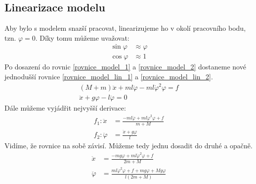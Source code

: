 \documentclass[a4paper, 12pt]{article}
\begin{document}
		\subsection{Linearizace modelu}
			Aby bylo s modelem snazší pracovat, linearizujeme ho v okolí pracovního bodu, tzn. $\varphi = 0$. Díky tomu můžeme uvažovat:
			\begin{align*}
				\sin\varphi &\approx \varphi\\
				\cos\varphi	&\approx 1
			\end{align*}
			Po dosazení do rovnic \ref{rovnice_model_1} a \ref{rovnice_model_2} dostaneme nové jednodušší rovnice \ref{rovnice_model_lin_1} a \ref{rovnice_model_lin_2}.
			\begin{align}
				\left(M+m\right)\ddot{x}+ml\ddot{\varphi}-ml\dot{\varphi}^2\varphi = f
				\label{rovnice_model_lin_1}\\
				\ddot{x}+g\varphi-l\ddot{\varphi} = 0
			    \label{rovnice_model_lin_2}
			\end{align}
			Dále můžeme vyjádřit nejvyšší derivace:
			\begin{align*}
				f_1: \ddot{x}&=\frac{-ml\ddot{\varphi}+ml\dot{\varphi}^2\varphi+f}{m+M}\\
				f_2: \ddot{\varphi}&=\frac{\ddot{x}+g\varphi}{l}
			\end{align*}
			Vidíme, že rovnice na sobě závisí. Můžeme tedy jednu dosadit do druhé a opačně.
			\begin{align*}
				\ddot{x}&=\frac{-mg\varphi+ml\dot{\varphi}^2\varphi+f}{2m+M}\\
				\ddot{\varphi}&=\frac{ml\dot{\varphi}^2\varphi+f+mg\varphi+Mg\varphi}{l\left(2m+M\right)}
			\end{align*}
\end{document}
